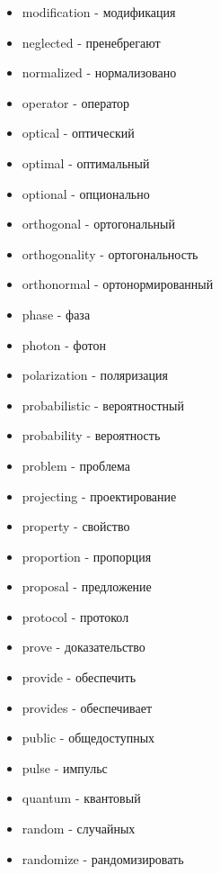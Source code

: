 \begin{multicols}{2}
\begin{itemize}
\item modification - модификация

\item neglected - пренебрегают

\item normalized - нормализовано

\item operator - оператор
\item optical - оптический
\item optimal - оптимальный

\item optional - опционально

\item orthogonal - ортогональный
\item orthogonality - ортогональность
\item orthonormal - ортонормированный

\item phase - фаза
\item photon - фотон

\item polarization - поляризация


\item probabilistic - вероятностный
\item probability - вероятность
\item problem - проблема

\item projecting - проектирование

\item property - свойство
\item proportion - пропорция
\item proposal - предложение

\item protocol - протокол

\item prove - доказательство

\item provide - обеспечить
\item provides - обеспечивает

\item public - общедоступных
\item pulse - импульс

\item quantum - квантовый
\item random - случайных
\item randomize - рандомизировать


\end{itemize}
\end{multicols}

